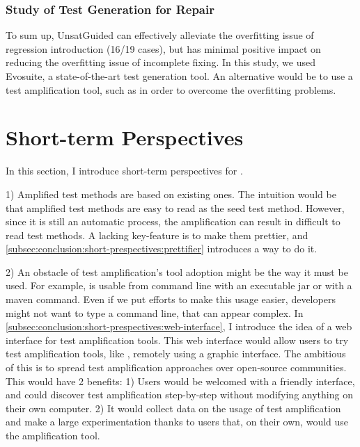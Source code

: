 \subsubsection{Study of Test Generation for Repair}
\label{subsubsec:conclusion:contributions-summary:transversal-contributions:test-for-repair}

To sum up, UnsatGuided can effectively alleviate the overfitting issue of regression introduction (16/19 cases), but has minimal positive impact on reducing the overfitting issue of incomplete fixing.
In this study, we used Evosuite, a state-of-the-art test generation tool.
An alternative would be to use a test amplification tool, such as \dspot in order to overcome the overfitting problems.

\section{Short-term Perspectives}
\label{sec:conclusion:short-prespectives}

In this section, I introduce short-term perspectives for \dspot.

1) Amplified test methods are based on existing ones.
The intuition would be that amplified test methods are easy to read as the seed test method.
However, since it is still an automatic process, the amplification can result in  difficult to read test methods.
A lacking key-feature is to make them prettier, and \autoref{subsec:conclusion:short-prespectives:prettifier} introduces a way to do it.

2) An obstacle of test amplification's tool adoption might be the way it must be used.
For example, \dspot is usable from command line with an executable jar or with a maven command.
Even if we put efforts to make this usage easier, developers might not want to type a command line, that can appear complex.
In \autoref{subsec:conclusion:short-prespectives:web-interface}, I introduce the idea of a web interface for test amplification tools.
This web interface would allow users to try test amplification tools, like \dspot, remotely using a graphic interface.
The ambitious of this is to spread test amplification approaches over open-source communities.
This would have 2 benefits:
1) Users would be welcomed with a friendly interface, and could discover test amplification step-by-step without modifying anything on their own computer.
2) It would collect data on the usage of test amplification and make a large experimentation thanks to users that, on their own, would use the amplification tool.

